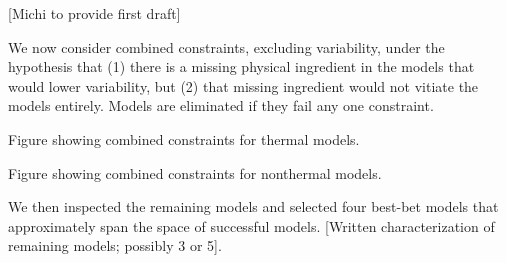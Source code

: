 [Michi to provide first draft]

We now consider combined constraints, excluding variability, under the hypothesis that (1) there is a missing physical ingredient in the models that would lower variability, but (2) that missing ingredient would not vitiate the models entirely.  Models are eliminated if they fail any one constraint.

Figure showing combined constraints for thermal models.

Figure showing combined constraints for nonthermal models.

We then inspected the remaining models and selected four best-bet models that approximately span the space of successful models.  [Written characterization of remaining models; possibly 3 or 5].
